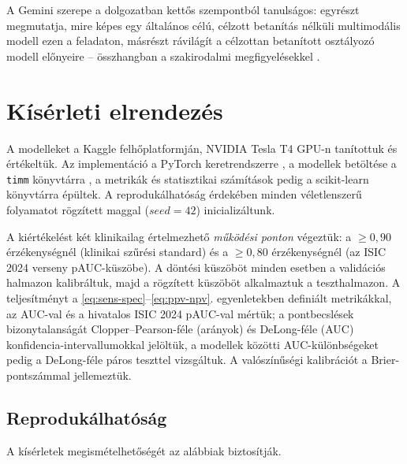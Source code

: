 A Gemini szerepe a dolgozatban kettős szempontból tanulságos: egyrészt
megmutatja, mire képes egy általános célú, célzott betanítás nélküli multimodális
modell ezen a feladaton, másrészt rávilágít a célzottan betanított
osztályozó modell előnyeire -- összhangban a szakirodalmi megfigyelésekkel
\cite{cirone2024llm}.

\section{Kísérleti elrendezés}

A modelleket a Kaggle felhőplatformján, NVIDIA Tesla T4 GPU-n tanítottuk és
értékeltük. Az implementáció a PyTorch keretrendszerre \cite{paszke2019pytorch}, a
modellek betöltése a \texttt{timm} könyvtárra \cite{wightman2019timm}, a metrikák
és statisztikai számítások pedig a scikit-learn könyvtárra
\cite{pedregosa2011sklearn} épültek. A reprodukálhatóság érdekében minden
véletlenszerű folyamatot rögzített maggal ($seed = 42$) inicializáltunk.

A kiértékelést két klinikailag értelmezhető \textit{működési ponton} végeztük: a
$\ge 0{,}90$ érzékenységnél (klinikai szűrési standard) és a $\ge 0{,}80$
érzékenységnél (az ISIC 2024 verseny pAUC-küszöbe). A döntési küszöböt minden
esetben a validációs halmazon kalibráltuk, majd a rögzített küszöböt alkalmaztuk
a teszthalmazon. A teljesítményt a \ref{eq:sens-spec}--\ref{eq:ppv-npv}.
egyenletekben definiált metrikákkal, az AUC-val és a hivatalos ISIC 2024 pAUC-val
mértük; a pontbecslések bizonytalanságát Clopper--Pearson-féle (arányok) és
DeLong-féle (AUC) konfidencia-intervallumokkal \cite{sun2014delong} jelöltük, a
modellek közötti AUC-különbségeket pedig a DeLong-féle páros teszttel
vizsgáltuk. A valószínűségi kalibrációt a Brier-pontszámmal
\cite{guo2017calibration} jellemeztük.

\subsection{Reprodukálhatóság}

A kísérletek megismételhetőségét az alábbiak biztosítják.

